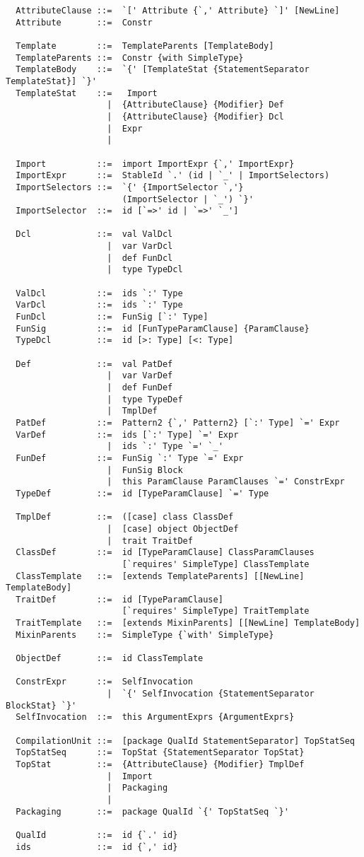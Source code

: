 \begin{lstlisting}
  AttributeClause ::=  `[' Attribute {`,' Attribute} `]' [NewLine]
  Attribute       ::=  Constr

  Template        ::=  TemplateParents [TemplateBody]
  TemplateParents ::=  Constr {with SimpleType}
  TemplateBody    ::=  `{' [TemplateStat {StatementSeparator TemplateStat}] `}'
  TemplateStat    ::=   Import
                    |  {AttributeClause} {Modifier} Def
                    |  {AttributeClause} {Modifier} Dcl
                    |  Expr
                    |

  Import          ::=  import ImportExpr {`,' ImportExpr}
  ImportExpr      ::=  StableId `.' (id | `_' | ImportSelectors)
  ImportSelectors ::=  `{' {ImportSelector `,'} 
                       (ImportSelector | `_') `}'
  ImportSelector  ::=  id [`=>' id | `=>' `_']

  Dcl             ::=  val ValDcl
                    |  var VarDcl
                    |  def FunDcl
                    |  type TypeDcl

  ValDcl          ::=  ids `:' Type
  VarDcl          ::=  ids `:' Type
  FunDcl          ::=  FunSig [`:' Type]
  FunSig          ::=  id [FunTypeParamClause] {ParamClause}
  TypeDcl         ::=  id [>: Type] [<: Type]

  Def             ::=  val PatDef
                    |  var VarDef
                    |  def FunDef
                    |  type TypeDef
                    |  TmplDef
  PatDef          ::=  Pattern2 {`,' Pattern2} [`:' Type] `=' Expr
  VarDef          ::=  ids [`:' Type] `=' Expr
                    |  ids `:' Type `=' `_'
  FunDef          ::=  FunSig `:' Type `=' Expr
                    |  FunSig Block
                    |  this ParamClause ParamClauses `=' ConstrExpr
  TypeDef         ::=  id [TypeParamClause] `=' Type

  TmplDef         ::=  ([case] class ClassDef
                    |  [case] object ObjectDef
                    |  trait TraitDef
  ClassDef        ::=  id [TypeParamClause] ClassParamClauses 
                       [`requires' SimpleType] ClassTemplate 
  ClassTemplate   ::=  [extends TemplateParents] [[NewLine] TemplateBody]
  TraitDef        ::=  id [TypeParamClause]
                       [`requires' SimpleType] TraitTemplate
  TraitTemplate   ::=  [extends MixinParents] [[NewLine] TemplateBody]
  MixinParents    ::=  SimpleType {`with' SimpleType}
  
  ObjectDef       ::=  id ClassTemplate

  ConstrExpr      ::=  SelfInvocation
                    |  `{' SelfInvocation {StatementSeparator BlockStat} `}'
  SelfInvocation  ::=  this ArgumentExprs {ArgumentExprs}

  CompilationUnit ::=  [package QualId StatementSeparator] TopStatSeq
  TopStatSeq      ::=  TopStat {StatementSeparator TopStat}
  TopStat         ::=  {AttributeClause} {Modifier} TmplDef
                    |  Import
                    |  Packaging
                    |
  Packaging       ::=  package QualId `{' TopStatSeq `}'

  QualId          ::=  id {`.' id}
  ids             ::=  id {`,' id}
\end{lstlisting}

